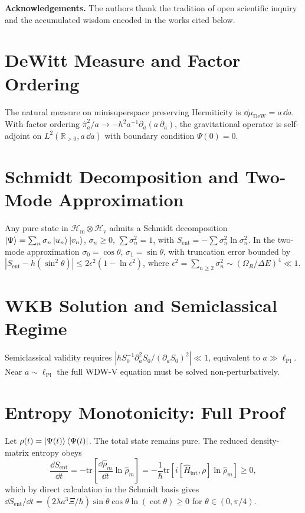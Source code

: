 \documentclass[12pt,a4paper]{article}
\theoremstyle{plain}
\theoremstyle{definition}
\newcommand{\HilM}{\mathscr{H}_{\mathrm{m}}}
\newcommand{\HilV}{\mathscr{H}_{\mathrm{v}}}
\newcommand{\Hint}{\hat{H}_{\mathrm{int}}}
\newcommand{\lpl}{\ell_{\mathrm{Pl}}}
\newcommand{\Sent}{S_{\mathrm{ent}}}
\begin{document}
\bigskip
\noindent\textbf{Acknowledgements.}
The authors thank the tradition of open scientific inquiry and the
accumulated wisdom encoded in the works cited below.

\appendix

\section{DeWitt Measure and Factor Ordering}
\label{app:dewitt}

The natural measure on minisuperspace preserving Hermiticity is
$\dd\mu_{\mathrm{DeW}} = a\,\dd a$.
With factor ordering $\hat\pi_a^2/a \to -\hbar^2 a^{-1}\partial_a(a\,\partial_a)$,
the gravitational operator is self-adjoint on
$L^2(\mathbb{R}_{>0}, a\,\dd a)$ with boundary condition $\Psi(0)=0$.

\section{Schmidt Decomposition and Two-Mode Approximation}
\label{app:schmidt}

Any pure state in $\HilM\otimes\HilV$ admits a Schmidt decomposition
$\ket\Psi = \sum_n\sigma_n\ket{u_n}\ket{v_n}$, $\sigma_n\ge 0$,
$\sum\sigma_n^2 = 1$, with $\Sent = -\sum\sigma_n^2\ln\sigma_n^2$.
In the two-mode approximation $\sigma_0 = \cos\theta$,
$\sigma_1 = \sin\theta$, with truncation error bounded by
$|\Sent - h(\sin^2\!\theta)| \le 2\epsilon^2(1-\ln\epsilon^2)$,
where $\epsilon^2 = \sum_{n\ge 2}\sigma_n^2
\sim (\Omega_R/\Delta E)^4 \ll 1$.

\section{WKB Solution and Semiclassical Regime}
\label{app:wkb}

Semiclassical validity requires
$|\hbar S_0^{-1}\partial_a^2 S_0/(\partial_a S_0)^2| \ll 1$,
equivalent to $a\gg\lpl$.
Near $a\sim\lpl$ the full WDW-V equation must be solved
non-perturbatively.

\section{Entropy Monotonicity: Full Proof}
\label{app:entropy_proof}

Let $\rho(t) = \ket{\Psi(t)}\bra{\Psi(t)}$.
The total state remains pure.
The reduced density-matrix entropy obeys
\[
  \frac{\dd\Sent}{\dd t}
  = -\mathrm{tr}\!\left[\frac{\dd\hat\rho_m}{\dd t}\ln\hat\rho_m\right]
  = -\frac{1}{\hbar}\mathrm{tr}\!\left[
    i[\Hint,\rho]\ln\hat\rho_m
  \right] \ge 0,
\]
which by direct calculation in the Schmidt basis gives
$\dd\Sent/\dd t
= (2\lambda a^3\Xi/\hbar)\sin\theta\cos\theta\ln(\cot\theta) \ge 0$
for $\theta\in(0,\pi/4)$.
\end{document}
